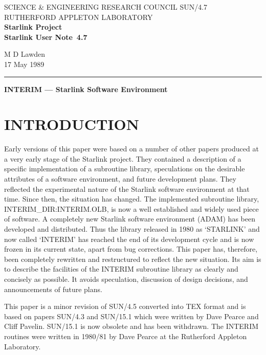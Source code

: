 \documentclass{article}
\newcommand{\stardoccategory}  {Starlink User Note}
\newcommand{\stardocinitials}  {SUN}
\newcommand{\stardocnumber}    {4.7}
\newcommand{\stardocauthors}   {M D Lawden}
\newcommand{\stardocdate}      {17 May 1989}
\newcommand{\stardoctitle}     {INTERIM --- Starlink Software Environment}
\newcommand{\stardocname}{\stardocinitials /\stardocnumber}
\begin{document}
\thispagestyle{empty}
SCIENCE \& ENGINEERING RESEARCH COUNCIL \hfill \stardocname\\
RUTHERFORD APPLETON LABORATORY\\
{\large\bf Starlink Project\\}
{\large\bf \stardoccategory\ \stardocnumber}
\begin{flushright}
\stardocauthors\\
\stardocdate
\end{flushright}
\vspace{-4mm}
\rule{\textwidth}{0.5mm}
\vspace{5mm}
\begin{center}
{\Large\bf \stardoctitle}
\end{center}
\vspace{5mm}

\setlength{\parskip}{0mm}
\tableofcontents
\setlength{\parskip}{\medskipamount}
\markright{\stardocname}

\newpage

\section {INTRODUCTION}
Early versions of this paper were based on a number of other papers produced
at a very early stage of the Starlink project.
They contained a description of a specific implementation of a subroutine
library, speculations on the desirable attributes of a software environment,
and future development plans.
They reflected the experimental nature of the Starlink software environment
at that time.
Since then, the situation has changed.
The implemented subroutine library, INTERIM\_DIR:INTERIM.OLB, is now a well
established and widely used piece of software.
A completely new Starlink software environment (ADAM) has been developed and
distributed.
Thus the library released in 1980 as `STARLINK' and now called `INTERIM' has
reached the end of its development cycle and is now frozen in its current state,
apart from bug corrections.
This paper has, therefore, been completely rewritten and restructured to reflect
the new situation.
Its aim is to describe the facilities of the INTERIM subroutine library as
clearly and concisely as possible.
It avoids speculation, discussion of design decisions, and announcements of
future plans.

This paper is a minor revision of SUN/4.5 converted into TEX format and is based
on papers SUN/4.3 and SUN/15.1 which were written by Dave Pearce and Cliff
Pavelin.
SUN/15.1 is now obsolete and has been withdrawn.
The INTERIM routines were written in 1980/81 by Dave Pearce at the Rutherford
Appleton Laboratory.
\end{document}
